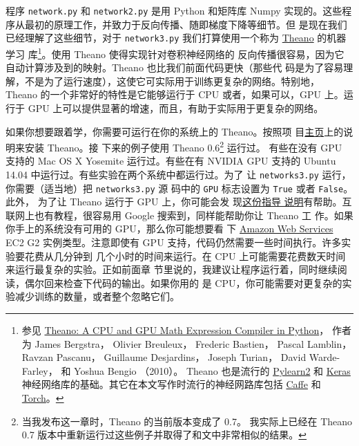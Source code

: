 程序 \lstinline!network.py! 和 \lstinline!network2.py! 是用 Python 和矩阵库
Numpy 实现的。这些程序从最初的原理工作，并致力于反向传播、随即梯度下降等细节。但
是现在我们已经理解了这些细节，对于 \lstinline!network3.py! 我们打算使用一个称为
\href{http://deeplearning.net/software/theano/}{Theano} 的机器学习
库\footnote{参见 \href{http://www.iro.umontreal.ca/~lisa/pointeurs/theano_scipy2010.pdf}{Theano: A CPU and GPU Math Expression Compiler in Python}，
作者为 James Bergstra， Olivier Breuleux， Frederic Bastien， Pascal Lamblin， Ravzan
  Pascanu， Guillaume Desjardins， Joseph Turian， David Warde-Farley， 和 Yoshua
  Bengio （2010）。 Theano 也是流行的 \href{http://deeplearning.net/software/pylearn2/}{Pylearn2} 和
	 \href{http://keras.io/}{Keras} 神经网络库的基础。其它在本文写作时流行的神经网路库包括
  \href{http://caffe.berkeleyvision.org/}{Caffe} 和 \href{http://torch.ch/}{Torch}。}。使用 Theano 使得实现针对卷积神经网络的
反向传播很容易，因为它自动计算涉及到的映射。Theano 也比我们前面代码更快（那些代
  码是为了容易理解，不是为了运行速度），这使它可实际用于训练更复杂的网络。特别地，
Theano 的一个非常好的特性是它能够运行于 CPU 或者，如果可以，GPU 上。运行于 GPU
上可以提供显著的增速，而且，有助于实际用于更复杂的网络。

如果你想要跟着学，你需要可运行在你的系统上的 Theano。按照项
目\href{http://deeplearning.net/software/theano/}{主页}上的说明来安装 Theano。接
下来的例子使用 Theano 0.6\footnote{当我发布这一章时，Theano 的当前版本变成了 0.7。
我实际上已经在 Theano 0.7 版本中重新运行过这些例子并取得了和文中非常相似的结果。} 运行过。
有些在没有 GPU 支持的 Mac OS X Yosemite 运行过。有些在有 NVIDIA
GPU 支持的 Ubuntu 14.04 中运行过。有些实验在两个系统中都运行过。为了
让 \lstinline!networks3.py! 运行，你需要（适当地）把 \lstinline!networks3.py! 源
码中的 \lstinline!GPU! 标志设置为 \lstinline!True! 或者 \lstinline!False!。此外，
为了让 Theano 运行于 GPU 上，你可能会发
现\href{http://deeplearning.net/software/theano/tutorial/using_gpu.html}{这份指导
  说明}有帮助。互联网上也有教程，很容易用 Google 搜索到，同样能帮助你让 Theano 工
作。如果你手上的系统没有可用的 GPU，那么你可能想要看
下 \href{http://aws.amazon.com/ec2/instance-types/}{Amazon Web Services} EC2 G2
实例类型。注意即使有 GPU 支持，代码仍然需要一些时间执行。许多实验要花费从几分钟到
几个小时的时间来运行。在 CPU 上可能需要花费数天时间来运行最复杂的实验。正如前面章
节里说的，我建议让程序运行着，同时继续阅读，偶尔回来检查下代码的输出。如果你用的
是 CPU，你可能需要对更复杂的实验减少训练\epochs{}的数量，或者整个忽略它们。

